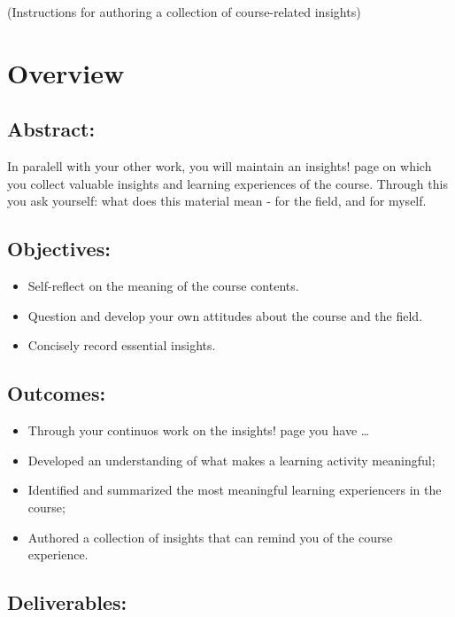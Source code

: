 \documentclass[]{book}
\providecommand{\tightlist}{%
  \setlength{\itemsep}{0pt}\setlength{\parskip}{0pt}}
\begin{document}
(Instructions for authoring a collection of course-related insights)

\section{Overview}\label{overview-2}

\subsection{Abstract:}\label{abstract-2}

In paralell with your other work, you will maintain an insights! page on
which you collect valuable insights and learning experiences of the
course. Through this you ask yourself: what does this material mean -
for the field, and for myself.

\subsection{Objectives:}\label{objectives-2}

\begin{itemize}
\tightlist
\item
  Self-reflect on the meaning of the course contents.
\item
  Question and develop your own attitudes about the course and the
  field.
\item
  Concisely record essential insights.
\end{itemize}

\subsection{Outcomes:}\label{outcomes-2}

\begin{itemize}
\tightlist
\item
  Through your continuos work on the insights! page you have \ldots{}
\item
  Developed an understanding of what makes a learning activity
  meaningful;
\item
  Identified and summarized the most meaningful learning experiencers in
  the course;
\item
  Authored a collection of insights that can remind you of the course
  experience.
\end{itemize}

\subsection{Deliverables:}\label{deliverables-2}
\end{document}

